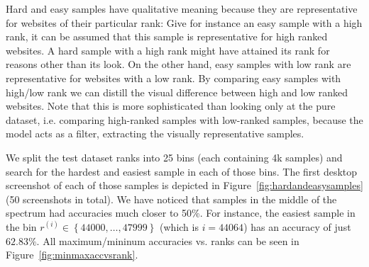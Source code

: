 Hard and easy samples have qualitative meaning because they are representative for websites of their particular rank: Give for instance an easy sample with a high rank, it can be assumed that this sample is representative for high ranked websites. A hard sample with a high rank might have attained its rank for reasons other than its look. On the other hand, easy samples with low rank are representative for websites with a low rank. By comparing easy samples with high/low rank we can distill the visual difference between high and low ranked websites. Note that this is more sophisticated than looking only at the pure dataset, i.e. comparing high-ranked samples with low-ranked samples, because the model acts as a filter, extracting the visually representative samples.

We split the test dataset ranks into 25 bins (each containing 4k samples) and search for the hardest and easiest sample in each of those bins. The first desktop screenshot of each of those samples is depicted in Figure~\ref{fig:hardandeasysamples} (50 screenshots in total). We have noticed that samples in the middle of the spectrum had accuracies much closer to 50\%. For instance, the easiest sample in the bin $r^{(i)}\in{\left\{44000, \dots, 47999\right\}}$ (which is $i=44064$) has an accuracy of just $62.83\%$. All maximum/mininum accuracies vs. ranks can be seen in Figure~\ref{fig:minmaxaccvsrank}.


